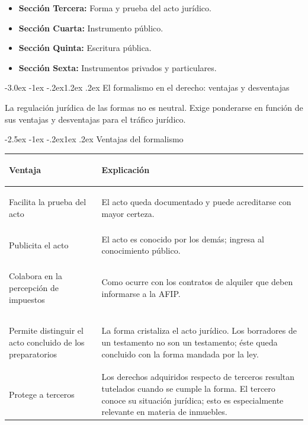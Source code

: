 \documentclass[12pt,oneside]{book}
\makeatletter
\renewcommand\section{\@startsection{section}{1}{\z@}%
  {-3.0ex \@plus -1ex \@minus -.2ex}{1.2ex \@plus .2ex}%
  {\normalfont\large\bfseries\color{acento}}}
\renewcommand\subsection{\@startsection{subsection}{2}{\z@}%
  {-2.5ex \@plus -1ex \@minus -.2ex}{1ex \@plus .2ex}%
  {\normalfont\normalsize\bfseries}}
\makeatother
\begin{document}
\begin{itemize}
    \item \textbf{Sección Tercera:} Forma y prueba del acto jurídico.
    \item \textbf{Sección Cuarta:} Instrumento público.
    \item \textbf{Sección Quinta:} Escritura pública.
    \item \textbf{Sección Sexta:} Instrumentos privados y particulares.
\end{itemize}

\section{El formalismo en el derecho: ventajas y desventajas}

La regulación jurídica de las formas no es neutral. Exige ponderarse en función de sus ventajas y desventajas para el tráfico jurídico.

\subsection{Ventajas del formalismo}

\begin{table}[H]
\centering
\begin{tabularx}{\textwidth}{>{\bfseries\raggedright\arraybackslash}p{}
                              >{\raggedright\arraybackslash}X}
\toprule
Ventaja & Explicación \\
\midrule
Facilita la prueba del acto & El acto queda documentado y puede acreditarse con mayor certeza. \\[4pt]
Publicita el acto & El acto es conocido por los demás; ingresa al conocimiento público. \\[4pt]
Colabora en la percepción de impuestos & Como ocurre con los contratos de alquiler que deben informarse a la AFIP. \\[4pt]
Permite distinguir el acto concluido de los preparatorios & La forma cristaliza el acto jurídico. Los borradores de un testamento no son un testamento; éste queda concluido con la forma mandada por la ley. \\[4pt]
Protege a terceros & Los derechos adquiridos respecto de terceros resultan tutelados cuando se cumple la forma. El tercero conoce su situación jurídica; esto es especialmente relevante en materia de inmuebles. \\
\bottomrule
\end{tabularx}
\end{table}
\end{document}
